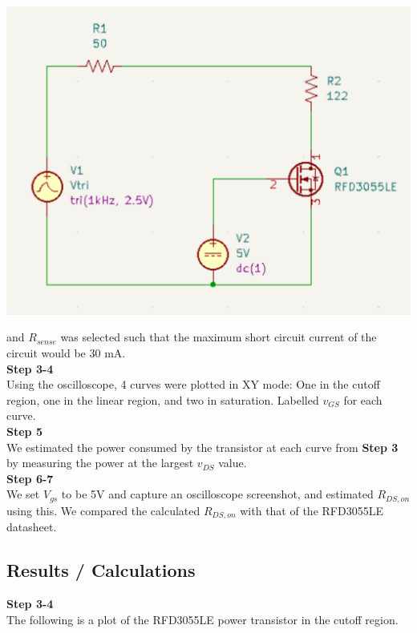 \documentclass[notitlepage, 12pt]{report}  %
\begin{document}
\begin{center}
    \includegraphics[scale=0.2]{task1.png}
\end{center}

and $R_{sense}$ was selected such that the maximum short circuit current of the circuit would be 30 mA. \\

\textbf{Step 3-4} \\
Using the oscilloscope, 4 curves were plotted in XY mode: One in the cutoff region, one in the linear region, and two in saturation. 
Labelled $v_{GS}$ for each curve. \\

\textbf{Step 5}\\
We estimated the power consumed by the transistor at each curve from \textbf{Step 3} by measuring the power at the largest
$v_{DS}$ value.\\

\textbf{Step 6-7}\\
We set $V_{gs}$ to be 5V and capture an oscilloscope screenshot, and estimated $R_{DS, on}$ using this. 
We compared the calculated $R_{DS, on}$ with that of the RFD3055LE datasheet. \\

\newpage

\subsection*{Results / Calculations}
\indent\indent \textbf{Step 3-4}\\
The following is a plot of the RFD3055LE power transistor in the cutoff region.\\
\end{document}
